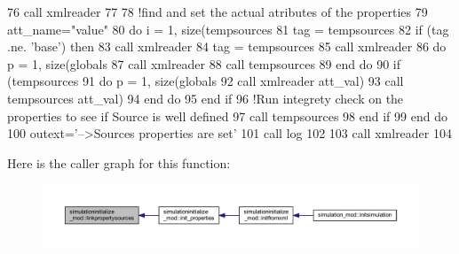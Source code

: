\begin{DoxyCode}
76     \textcolor{keyword}{call }xmlreader%
77 
78     \textcolor{comment}{!find and set the actual atributes of the properties}
79     att\_name=\textcolor{stringliteral}{"value"}
80     \textcolor{keywordflow}{do} i = 1, \textcolor{keyword}{size}(tempsources%
81         tag = tempsources%
82         \textcolor{keywordflow}{if} (tag .ne. \textcolor{stringliteral}{'base'}) \textcolor{keywordflow}{then}
83             \textcolor{keyword}{call }xmlreader%
84             tag = tempsources%
85             \textcolor{keyword}{call }xmlreader%
86             \textcolor{keywordflow}{do} p = 1, \textcolor{keyword}{size}(globals%
87                 \textcolor{keyword}{call }xmlreader%
88                 \textcolor{keyword}{call }tempsources%
89 \textcolor{keywordflow}{            end do}
90             \textcolor{keywordflow}{if} (tempsources%
91                 \textcolor{keywordflow}{do} p = 1, \textcolor{keyword}{size}(globals%
92                     \textcolor{keyword}{call }xmlreader%
      att\_val)
93                     \textcolor{keyword}{call }tempsources%
      att\_val)
94 \textcolor{keywordflow}{                end do}
95 \textcolor{keywordflow}{            end if}
96             \textcolor{comment}{!Run integrety check on the properties to see if Source is well defined}
97             \textcolor{keyword}{call }tempsources%
98 \textcolor{keywordflow}{        end if}
99 \textcolor{keywordflow}{    end do}
100     outext=\textcolor{stringliteral}{'-->Sources properties are set'}
101     \textcolor{keyword}{call }log%
102 
103     \textcolor{keyword}{call }xmlreader%
104 
\end{DoxyCode}
Here is the caller graph for this function\+:\nopagebreak
\begin{figure}[H]
\begin{center}
\leavevmode
\includegraphics[width=350pt]{namespacesimulationinitialize__mod_aa4c1099b84c9901ab1286a3796a54f71_icgraph}
\end{center}
\end{figure}
